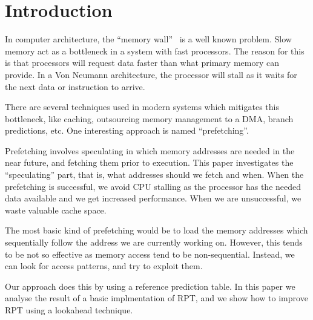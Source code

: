 \section{Introduction}

In computer architecture, the ``memory wall''~\cite{wulf_mckee_1995}
is a well known problem. Slow memory act as a bottleneck in a system
with fast processors. The reason for this is that processors will
request data faster than what primary memory can provide. In a Von
Neumann architecture, the processor
will stall as it waits for the next data or instruction to arrive.

There are several techniques used in modern systems which mitigates
this bottleneck, like caching, outsourcing memory management to a DMA,
branch predictions, etc. One interesting approach is named
``prefetching''.

Prefetching involves speculating in which memory
addresses are needed in the near future, and fetching them prior to
execution. This paper investigates the ``speculating'' part, that is,
what addresses should we fetch and when. When the prefetching is
successful, we avoid CPU stalling as the processor has the needed data
available and we get increased performance. When we are unsuccessful,
we waste valuable cache space.

The most basic kind of prefetching would be to load the memory
addresses which sequentially follow the address we are currently
working on. However, this tends to be not so effective as memory
access tend to be non-sequential. Instead, we can look for access
patterns, and try to exploit them.

Our approach does this by using a reference prediction table.
In this paper we analyse the result of a basic implmentation of RPT,
and we show how to improve RPT using a lookahead technique.


